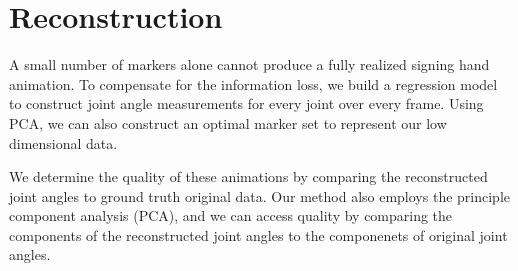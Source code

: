 
\section{Reconstruction}


A small number of markers alone cannot produce a fully
realized signing hand animation. To compensate for the 
information loss, we build a regression model 
to construct joint angle measurements for every joint over 
every frame. 
Using PCA, we can also construct an optimal marker set to represent our 
low dimensional data. 


We determine the quality of these animations
by comparing the reconstructed joint angles to ground truth
original data. Our method also employs the principle
component analysis (PCA), and we can access quality by 
comparing the components of the reconstructed joint angles
to the componenets of original joint angles.


